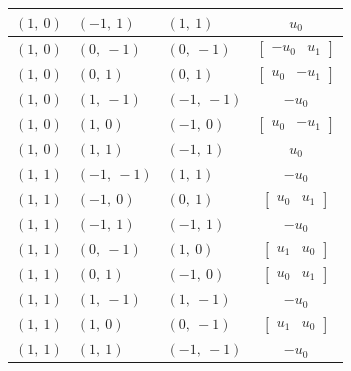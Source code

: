 \documentclass[11pt]{article}
\theoremstyle{definition}
\begin{document}
\begin{longtable}{|l|l|l|c|}
    \hline
    $\left( 1, \  0\right)$ & $\left( -1, \  1\right)$ & $\left( 1, \  1\right)$ & $u_{0}$ \\
    \hline
    $\left( 1, \  0\right)$ & $\left( 0, \  -1\right)$ & $\left( 0, \  -1\right)$ & $\left[\begin{matrix}- u_{0} & u_{1}\end{matrix}\right]$ \\
    \hline
    $\left( 1, \  0\right)$ & $\left( 0, \  1\right)$ & $\left( 0, \  1\right)$ & $\left[\begin{matrix}u_{0} & - u_{1}\end{matrix}\right]$ \\
    \hline
    $\left( 1, \  0\right)$ & $\left( 1, \  -1\right)$ & $\left( -1, \  -1\right)$ & $- u_{0}$ \\
    \hline
    $\left( 1, \  0\right)$ & $\left( 1, \  0\right)$ & $\left( -1, \  0\right)$ & $\left[\begin{matrix}u_{0} & - u_{1}\end{matrix}\right]$ \\
    \hline
    $\left( 1, \  0\right)$ & $\left( 1, \  1\right)$ & $\left( -1, \  1\right)$ & $u_{0}$ \\
    \hline
    $\left( 1, \  1\right)$ & $\left( -1, \  -1\right)$ & $\left( 1, \  1\right)$ & $- u_{0}$ \\
    \hline
    $\left( 1, \  1\right)$ & $\left( -1, \  0\right)$ & $\left( 0, \  1\right)$ & $\left[\begin{matrix}u_{0} & u_{1}\end{matrix}\right]$ \\
    \hline
    $\left( 1, \  1\right)$ & $\left( -1, \  1\right)$ & $\left( -1, \  1\right)$ & $- u_{0}$ \\
    \hline
    $\left( 1, \  1\right)$ & $\left( 0, \  -1\right)$ & $\left( 1, \  0\right)$ & $\left[\begin{matrix}u_{1} & u_{0}\end{matrix}\right]$ \\
    \hline
    $\left( 1, \  1\right)$ & $\left( 0, \  1\right)$ & $\left( -1, \  0\right)$ & $\left[\begin{matrix}u_{0} & u_{1}\end{matrix}\right]$ \\
    \hline
    $\left( 1, \  1\right)$ & $\left( 1, \  -1\right)$ & $\left( 1, \  -1\right)$ & $- u_{0}$ \\
    \hline
    $\left( 1, \  1\right)$ & $\left( 1, \  0\right)$ & $\left( 0, \  -1\right)$ & $\left[\begin{matrix}u_{1} & u_{0}\end{matrix}\right]$ \\
    \hline
    $\left( 1, \  1\right)$ & $\left( 1, \  1\right)$ & $\left( -1, \  -1\right)$ & $- u_{0}$ \\
    \hline
\end{longtable}
\end{document}
